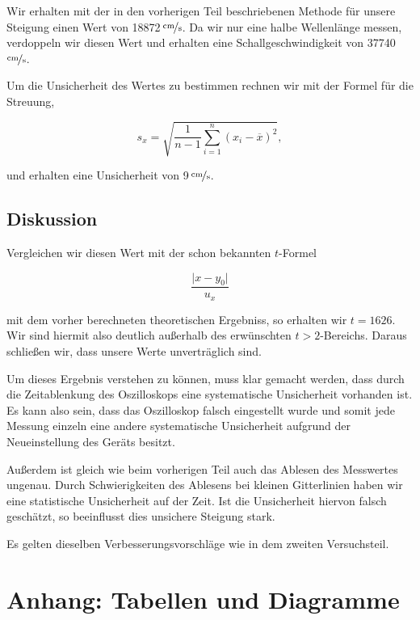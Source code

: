 \documentclass[11pt,a4paper]{article}
\begin{document}
Wir erhalten mit der in den vorherigen Teil beschriebenen Methode f\"ur unsere Steigung einen Wert von 18872\,$\nicefrac{\mathrm{cm}}{\mathrm{s}}$. Da wir nur eine halbe Wellenl\"ange messen, verdoppeln wir diesen Wert und erhalten eine Schallgeschwindigkeit von 37740\,$\nicefrac{\mathrm{cm}}{\mathrm{s}}$.

Um die Unsicherheit des Wertes zu bestimmen rechnen wir mit der Formel f\"ur die Streuung,

\[s_x=\sqrt{\frac{1}{n-1}\sum_{i=1}^n(x_i-\overline{x})^2},\]

und erhalten eine Unsicherheit von 9\,$\nicefrac{\mathrm{cm}}{\mathrm{s}}$.

\subsection{Diskussion}

Vergleichen wir diesen Wert mit der schon bekannten $t$-Formel

\[\frac{\vert x-y_0\vert}{u_x}\]

mit dem vorher berechneten theoretischen Ergebniss, so erhalten wir $t=1626$. Wir sind hiermit also deutlich au\ss erhalb des erw\"unschten $t>2$-Bereichs. Daraus schlie\ss en wir, dass unsere Werte unvertr\"aglich sind.

Um dieses Ergebnis verstehen zu k\"onnen, muss klar gemacht werden, dass durch die Zeitablenkung des Oszilloskops eine systematische Unsicherheit vorhanden ist. Es kann also sein, dass das Oszilloskop falsch eingestellt wurde und somit jede Messung einzeln eine andere systematische Unsicherheit aufgrund der Neueinstellung des Ger\"ats besitzt.

Au\ss erdem ist gleich wie beim vorherigen Teil auch das Ablesen des Messwertes ungenau. Durch Schwierigkeiten des Ablesens bei kleinen Gitterlinien haben wir eine statistische Unsicherheit auf der Zeit. Ist die Unsicherheit hiervon falsch gesch\"atzt, so beeinflusst dies unsichere Steigung stark.

Es gelten dieselben Verbesserungsvorschläge wie in dem zweiten Versuchsteil. 

\section{Anhang: Tabellen und Diagramme}
\end{document}

